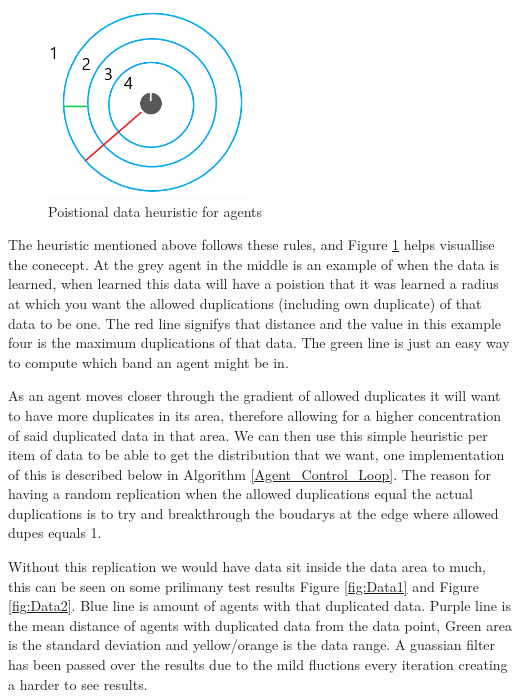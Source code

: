 \documentclass{UoYCSproject}
\begin{document}
\begin{figure}[htb]
\label{fig:Heuristic}
\begin{center}
\centering
\includegraphics[height=5cm]{"./Heuristic.png"}
\caption{Poistional data heuristic for agents}
\end{center}
\end{figure}

The heuristic mentioned above follows these rules, and Figure \ref{fig:Heuristic} helps visuallise the conecept. 
At the grey agent in the middle is an example of when the data is learned, when learned this data will have a poistion that it was learned a radius at which you want the allowed duplications (including own duplicate) of that data to be one.
The red line signifys that distance and the value in this example four is the maximum duplications of that data.
The green line is just an easy way to compute which band an agent might be in.

As an agent moves closer through the gradient of allowed duplicates it will want to have more duplicates in its area, therefore allowing for a higher concentration of said duplicated data in that area.
We can then use this simple heuristic per item of data to be able to get the distribution that we want, one implementation of this is described below in Algorithm \ref{Agent_Control_Loop}.
The reason for having a random replication when the allowed duplications equal the actual duplications is to try and breakthrough the boudarys at the edge where allowed dupes equals 1.

Without this replication we would have data sit inside the data area to much, this can be seen on some prilimany test results Figure \ref{fig:Data1} and Figure \ref{fig:Data2}.
Blue line is amount of agents with that duplicated data.
Purple line is the mean distance of agents with duplicated data from the data point, Green area is the standard deviation and yellow/orange is the data range.
A guassian filter has been passed over the results due to the mild fluctions every iteration creating a harder to see results.
\end{document}
